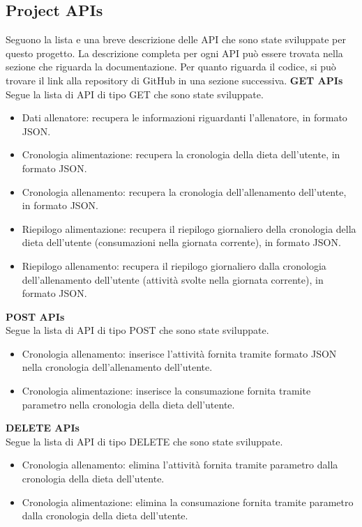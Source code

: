 \documentclass{article}
\begin{document}
   \subsection{Project APIs}
   Seguono la lista e una breve descrizione delle API che sono state sviluppate per questo progetto. La descrizione completa per ogni API può essere trovata nella sezione che riguarda la documentazione. Per quanto riguarda il codice, si può trovare il link alla repository di GitHub in una sezione successiva.
   \newline
   \textbf{GET APIs}\\  
   Segue la lista di API di tipo GET che sono state sviluppate.
   \begin{itemize}
      \item Dati allenatore: recupera le informazioni riguardanti l’allenatore, in formato JSON.
      \item Cronologia alimentazione: recupera la cronologia della dieta dell’utente, in formato JSON.
      \item Cronologia allenamento: recupera la cronologia dell’allenamento dell’utente, in formato JSON.
      \item Riepilogo alimentazione: recupera il riepilogo giornaliero della cronologia della dieta dell’utente (consumazioni nella giornata corrente), in formato JSON.
      \item Riepilogo allenamento: recupera il riepilogo giornaliero  dalla cronologia dell’allenamento dell’utente (attività svolte nella giornata corrente), in formato JSON.
   \end{itemize}
   \textbf{POST APIs}\\
   Segue la lista di API di tipo POST che sono state sviluppate.
   \begin{itemize}
      \item Cronologia allenamento: inserisce l’attività fornita tramite formato JSON nella cronologia dell’allenamento dell’utente.
      \item Cronologia alimentazione: inserisce la consumazione fornita tramite parametro nella cronologia della dieta dell’utente.
   \end{itemize}
   \textbf{DELETE APIs}\\
   Segue la lista di API di tipo DELETE che sono state sviluppate.
   \begin{itemize}
      \item Cronologia allenamento: elimina l’attività fornita tramite parametro dalla cronologia della dieta dell’utente.
      \item Cronologia alimentazione: elimina la consumazione fornita tramite parametro dalla cronologia della dieta dell’utente.
   \end{itemize}
\end{document}
